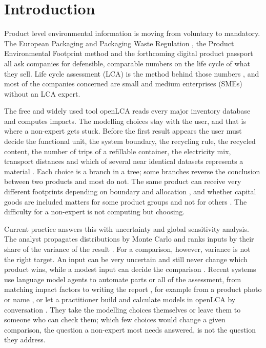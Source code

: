 \documentclass{article}
\begin{document}
\section{Introduction}

Product level environmental information is moving from voluntary to mandatory. The European Packaging and
Packaging Waste Regulation \citep{ppwr2024}, the Product Environmental Footprint method \citep{zampori2019}
and the forthcoming digital product passport all ask companies for defensible, comparable numbers on the
life cycle of what they sell. Life cycle assessment (LCA) is the method behind those numbers
\citep{iso14040,iso14044}, and most of the companies concerned are small and medium enterprises (SMEs)
without an LCA expert.

The free and widely used tool openLCA reads every major inventory database and computes impacts. The
modelling choices stay with the user, and that is where a non-expert gets stuck. Before the first result appears the user must decide the functional
unit, the system boundary, the recycling rule, the recycled content, the number of trips of a refillable
container, the electricity mix, transport distances and which of several near identical datasets
represents a material \citep{ilcd2010}. Each choice is a branch in a tree; some branches reverse the
conclusion between two products and most do not. The same product can receive very different footprints
depending on boundary and allocation \citep{schmidt2009}, and whether capital goods are included matters
for some product groups and not for others \citep{frischknecht2007}. The difficulty for a non-expert is
not computing but choosing.

Current practice answers this with uncertainty and global sensitivity analysis. The analyst propagates
distributions by Monte Carlo and ranks inputs by their share of the variance of the result
\citep{heijungs2001,groen2017,igos2019}. For a
comparison, however, variance is not the right target. An input can be very uncertain and still never
change which product wins, while a modest input can decide the comparison \citep{mendoza2018}. Recent
systems use language model agents to automate parts or all of the assessment, from matching impact factors
to writing the report \citep[reviewed by][]{preuss2026}, for example from a product photo or name
\citep{zhang2026}, or let a practitioner build and calculate models in openLCA by conversation
\citep{below280_2026}. They take the modelling choices themselves or leave them to someone who can check
them; which few choices would change a given comparison, the question a non-expert most needs answered,
is not the question they address.
\end{document}
